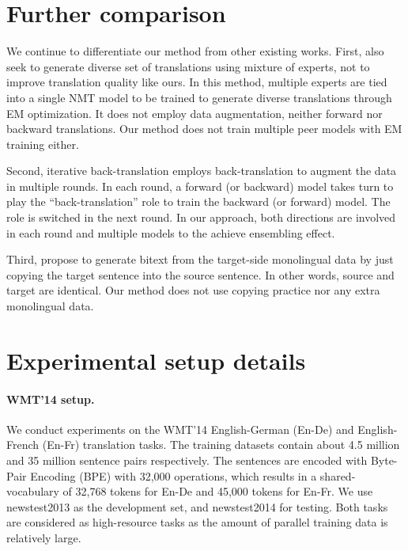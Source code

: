 \documentclass{article}
\begin{document}
\section{Further comparison}\label{app:compare}
We continue to differentiate our method from other existing works. First, \citet{mixture_model_nmt_shen2019} also seek to generate diverse set of translations using mixture of experts, not to improve translation quality like ours. In this method, multiple experts are tied into a single NMT model to be trained to generate diverse translations through EM optimization. It does not employ data augmentation, neither forward nor backward translations. Our method does not train multiple peer models with EM training either. 

Second, iterative back-translation \citep{iterative-hoang-etal-2018} employs back-translation to augment the data in multiple rounds. In each round, a forward (or backward) model takes turn to play the ``back-translation'' role to train the backward (or forward) model. The role is switched in the next round. In our approach, both directions are involved in each round and multiple models to the achieve ensembling effect.

Third, \citet{copied-currey-etal-2017} propose to generate bitext from the target-side monolingual data by just copying the target sentence into the source sentence. In other words, source and target are identical. Our method does not use copying practice nor any extra monolingual data.


\section{Experimental setup details} \label{app:setup}

\paragraph{WMT'14 setup.} We conduct experiments on the WMT'14 English-German (En-De) and English-French (En-Fr) translation tasks. The training datasets contain about 4.5 million and 35 million sentence pairs respectively. {The sentences are encoded with Byte-Pair Encoding (BPE) \citep{sennrich2015neural} with 32,000 operations, which results in a shared-vocabulary of 32,768 tokens for En-De and 45,000 tokens for En-Fr.} We use newstest2013 as the development set, and newstest2014 for testing. Both tasks are considered as high-resource tasks as the amount of parallel training data is relatively large. 
\end{document}
